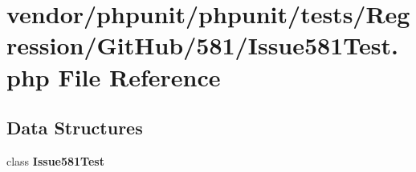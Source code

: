 \section{vendor/phpunit/phpunit/tests/\+Regression/\+Git\+Hub/581/\+Issue581\+Test.php File Reference}
\label{_issue581_test_8php}
\subsection*{Data Structures}
\begin{DoxyCompactItemize}
\item 
class {\bf Issue581\+Test}
\end{DoxyCompactItemize}
